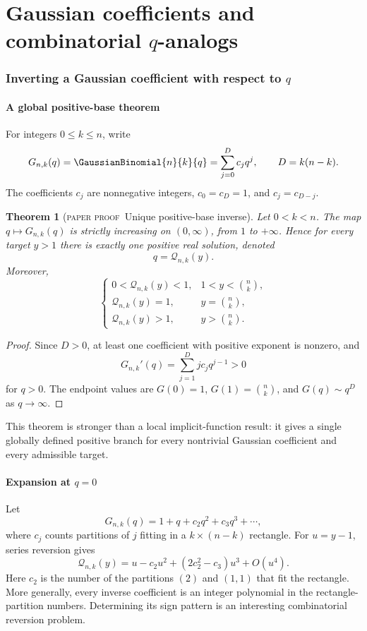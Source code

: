 \documentclass[11pt,oneside]{article}
\newtheorem{theorem}{Theorem}[section]
\theoremstyle{definition}
\theoremstyle{remark}
\theoremstyle{plain}
\theoremstyle{definition}
\theoremstyle{remark}
\newcommand{\statusproved}{\textcolor{provedgreen}{\textsc{paper proof}}}
\numberwithin{equation}{section}
\numberwithin{figure}{section}
\numberwithin{table}{section}
\let\reporttopsection\section
\let\reportsubsection\subsection
\let\reportsubsubsection\subsubsection
\let\chapter\reporttopsection
\let\section\reportsubsection
\let\subsection\reportsubsubsection
\begin{document}
\part{Gaussian coefficients and combinatorial \texorpdfstring{\(q\)}{q}-analogs}

\chapter{Inverting a Gaussian coefficient with respect to \texorpdfstring{\(q\)}{q}}

\section{A global positive-base theorem}
For integers \(0\le k\le n\), write
\[
 G_{n,k}(q)=\GaussianBinomial{n}{k}{q}
 =\sum_{j=0}^{D}c_jq^j,
 \qquad D=k(n-k).
\]
The coefficients \(c_j\) are nonnegative integers, \(c_0=c_D=1\), and
\(c_j=c_{D-j}\).

\begin{theorem}[\statusproved\ Unique positive-base inverse]
Let \(0<k<n\).  The map \(q\mapsto G_{n,k}(q)\) is strictly increasing on
\((0,\infty)\), from \(1\) to \(+\infty\).  Hence for every target \(y>1\)
there is exactly one positive real solution, denoted
\[
 q=\mathcal Q_{n,k}(y).
\]
Moreover,
\[
 \begin{cases}
 0<\mathcal Q_{n,k}(y)<1,&1<y<\binom nk,\\
 \mathcal Q_{n,k}(y)=1,&y=\binom nk,\\
 \mathcal Q_{n,k}(y)>1,&y>\binom nk.
 \end{cases}
\]
\end{theorem}
\begin{proof}
Since \(D>0\), at least one coefficient with positive exponent is nonzero, and
\[
 G_{n,k}'(q)=\sum_{j=1}^D jc_jq^{j-1}>0
\]
for \(q>0\).  The endpoint values are \(G(0)=1\),
\(G(1)=\binom nk\), and \(G(q)\sim q^D\) as \(q\to\infty\).
\end{proof}

This theorem is stronger than a local implicit-function result: it gives a
single globally defined positive branch for every nontrivial Gaussian
coefficient and every admissible target.

\section{Expansion at \texorpdfstring{\(q=0\)}{q=0}}
Let
\[
 G_{n,k}(q)=1+q+c_2q^2+c_3q^3+\cdots,
\]
where \(c_j\) counts partitions of \(j\) fitting in a
\(k\times(n-k)\) rectangle.  For \(u=y-1\), series reversion gives
\begin{equation}
 \mathcal Q_{n,k}(y)
 =u-c_2u^2+(2c_2^2-c_3)u^3+O(u^4).
 \label{eq:qbinom-inverse-zero}
\end{equation}
Here \(c_2\) is the number of the partitions \((2)\) and \((1,1)\) that fit
the rectangle.  More generally, every inverse coefficient is an integer
polynomial in the rectangle-partition numbers.  Determining its sign pattern is
an interesting combinatorial reversion problem.
\end{document}
